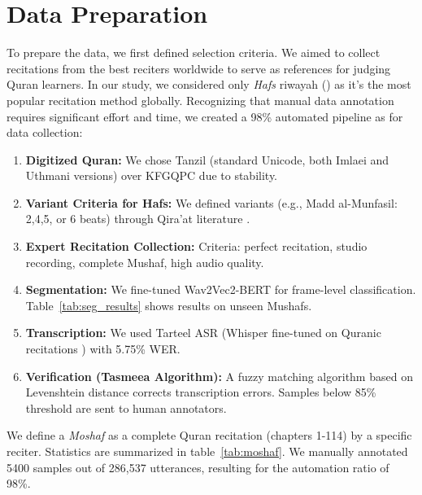 \section{Data Preparation}
To prepare the data, we first defined selection criteria. We aimed to collect recitations from the best reciters worldwide to serve as references for judging Quran learners. In our study, we considered only \textit{Hafs} riwayah () as it's the most popular recitation method globally. Recognizing that manual data annotation requires significant effort and time, we created a 98\% automated pipeline as for data collection:
\begin{enumerate}
    \item \textbf{Digitized Quran:} We chose Tanzil (standard Unicode, both Imlaei and Uthmani versions) over KFGQPC due to stability.
    \item \textbf{Variant Criteria for Hafs:} We defined variants (e.g., Madd al-Munfasil: 2,4,5, or 6 beats) through Qira'at literature \cite{al-dabbaa}.
    \item \textbf{Expert Recitation Collection:} Criteria: perfect recitation, studio recording, complete Mushaf, high audio quality.
    \item \textbf{Segmentation:} We fine-tuned Wav2Vec2-BERT \cite{barrault2023seamless} for frame-level classification. Table~\ref{tab:seg_results} shows results on unseen Mushafs.
    \item \textbf{Transcription:} We used Tarteel ASR \cite{tarteel_whisper_ar_quran} (Whisper fine-tuned on Quranic recitations \cite{radford2023robust}) with 5.75\% WER.
    \item \textbf{Verification (Tasmeea Algorithm):} A fuzzy matching algorithm based on Levenshtein distance \cite{levenshtein1966binary} corrects transcription errors. Samples below 85\% threshold are sent to human annotators.
\end{enumerate}

We define a \textit{Moshaf} as a complete Quran recitation (chapters 1-114) by a specific reciter. Statistics are summarized in table~\ref{tab:moshaf}. We manually annotated 5400 samples out of 286,537 utterances, resulting for the automation ratio of 98\%.

